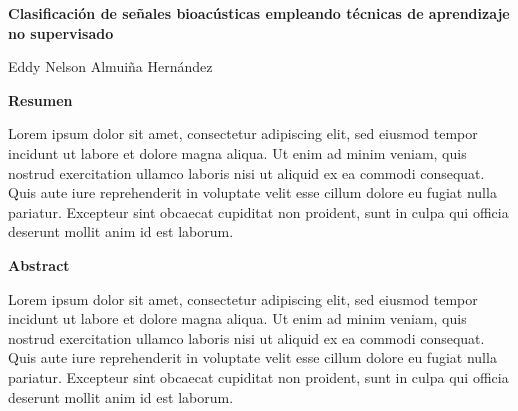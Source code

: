 \thispagestyle{empty}
\begin{center}
    \Large
    \textbf{Clasificación de señales bioacústicas empleando técnicas de aprendizaje no supervisado}

    \vspace{0.4cm}
    \large
    Eddy Nelson Almuiña Hernández

    \vspace{0.9cm}
    \textbf{Resumen}
\end{center}

Lorem ipsum dolor sit amet, consectetur adipiscing elit, sed eiusmod tempor incidunt ut labore et dolore magna aliqua.
Ut enim ad minim veniam, quis nostrud exercitation ullamco laboris nisi ut aliquid ex ea commodi consequat.
Quis aute iure reprehenderit in voluptate velit esse cillum dolore eu fugiat nulla pariatur.
Excepteur sint obcaecat cupiditat non proident, sunt in culpa qui officia deserunt mollit anim id est laborum.

\begin{center}
    \vspace{0.9cm}
    \textbf{Abstract}
\end{center}

Lorem ipsum dolor sit amet, consectetur adipiscing elit, sed eiusmod tempor incidunt ut labore et dolore magna aliqua.
Ut enim ad minim veniam, quis nostrud exercitation ullamco laboris nisi ut aliquid ex ea commodi consequat.
Quis aute iure reprehenderit in voluptate velit esse cillum dolore eu fugiat nulla pariatur.
Excepteur sint obcaecat cupiditat non proident, sunt in culpa qui officia deserunt mollit anim id est laborum.

\newpage
